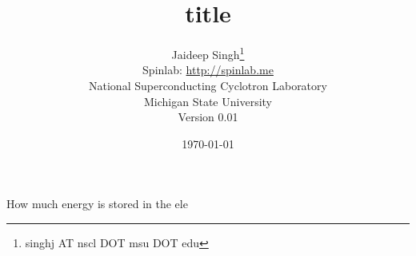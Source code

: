 \documentclass[letterpaper,12pt]{article}
\title{title}
\author{Jaideep Singh\footnote{singhj AT nscl DOT msu DOT edu}\\ Spinlab: \href{https://spinlab.me}{http://spinlab.me} \\ National Superconducting Cyclotron Laboratory\\ Michigan State University\\Version 0.01}
\date{\today}
\begin{document}
\maketitle
How much energy is stored in the ele

%
%
\end{document}
